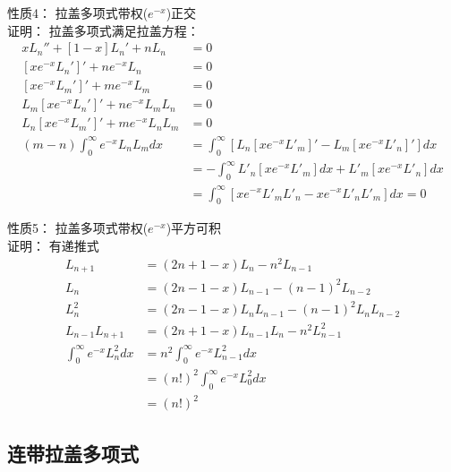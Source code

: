 	{\alert{	性质4：}}  拉盖多项式带权($e^{-x}$)正交 \\
	{\alert{	证明：}}  拉盖多项式满足拉盖方程：
	\begin{equation*}
		\begin{split}
			x L_n''  + [1 -x] L_n' +n L_n &=0  \\
			[xe^{-x}  L_n'] ' +n e^{-x} L_n &=0  \\
			[xe^{-x}  L_m'] ' +m e^{-x} L_m &=0  \\ 
			L_m[xe^{-x}  L_n'] ' +n e^{-x} L_m L_n &=0  \\
			L_n  [xe^{-x}  L_m'] ' +m e^{-x} L_n L_m& =0  \\ 
			(m-n) \int_{0}^{\infty}  e^{-x} L_n L_m dx &=  \int_{0}^{\infty} [L_n  [xe^{-x}  L' _m] ' - L_m[xe^{-x}  L' _n] '] dx \\
			&=  -\int_{0}^{\infty} L'_n  [xe^{-x}  L' _m] dx + L'_m[xe^{-x}  L' _n]  dx \\
			&=  \int_{0}^{\infty} [xe^{-x}  L' _m L' _n - xe^{-x}  L' _n L' _m]  dx =0
		\end{split}		
	\end{equation*}	
		


	{\alert{	性质5：}}  拉盖多项式带权($e^{-x}$)平方可积 \\
	{\alert{	证明：}}  有递推式
	\begin{equation*}
		\begin{split}
			L_{n+1} &= (2n+1-x) L_n  -n^2 L_{n-1}  \\
			L_{n} &= (2n-1-x) L_{n-1}  -(n-1)^2 L_{n-2}  \\
			L^2 _{n} &= (2n-1-x) L_n  L_{n-1}  -(n-1)^2 L_n L_{n-2}  \\
			L_{n-1}	L_{n+1} &= (2n+1-x)	L_{n-1}	 L_n  -n^2 	L^2 _{n-1}  \\
			\int_{0}^{\infty}  e^{-x}  L^2 _{n}  dx &=  n^2   \int_{0}^{\infty}  e^{-x}  L^2 _{n-1} dx  \\
			&=  (n!)^2   \int_{0}^{\infty}  e^{-x}  L^2 _{0} dx  \\
			&=  (n!)^2 
		\end{split}		
	\end{equation*}		
		

\subsection{连带拉盖多项式}


